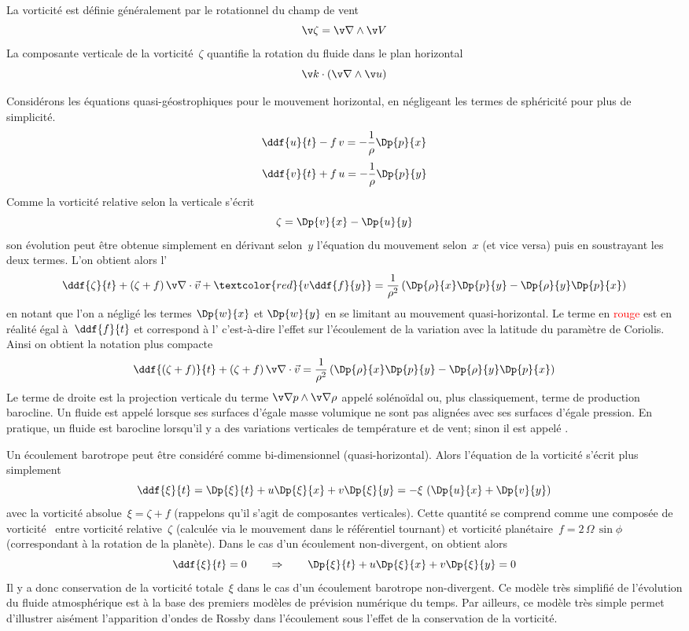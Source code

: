 \sk
La vorticité est définie généralement par le rotationnel du champ de vent
\[ \v \zeta = \v \nabla \wedge \v V \]
\noindent La composante verticale de la vorticité~$\zeta$
quantifie la rotation du fluide dans le plan horizontal
\[ \v k \cdot \left( \v \nabla \wedge \v u \right) \]

\sk
Considérons les équations quasi-géostrophiques pour le mouvement horizontal,
en négligeant les termes de sphéricité pour plus de simplicité.
\[ \ddf{u}{t} - f\,v = -\frac{1}{\rho} \Dp{p}{x} \]
\[ \ddf{v}{t} + f\,u = -\frac{1}{\rho} \Dp{p}{y} \]
\noindent Comme la vorticité relative selon la verticale s'écrit
\[ \zeta = \Dp{v}{x} - \Dp{u}{y} \]
\noindent son évolution peut être obtenue simplement en
dérivant selon~$y$ l'équation du mouvement selon~$x$
(et vice versa) puis en soustrayant les deux termes.
L'on obtient alors l'
\[
\ddf{\zeta}{t} + (\zeta+f) \, \v \nabla \cdot \vec v + \textcolor{red}{v \ddf{f}{y}}
= \frac{1}{\rho^2} \left( \Dp{\rho}{x} \Dp{p}{y} - \Dp{\rho}{y} \Dp{p}{x} \right)
\]
\noindent en notant que l'on a négligé les termes
$\Dp{w}{x}$ et $\Dp{w}{y}$ en se limitant au mouvement quasi-horizontal.
Le terme en \textcolor{red}{rouge} est en réalité égal à~$\ddf{f}{t}$
et correspond à l' c'est-à-dire
l'effet sur l'écoulement de la variation avec la
latitude du paramètre de Coriolis.
Ainsi on obtient la notation plus compacte
\[
\ddf{(\zeta + f)}{t} + (\zeta+f) \, \v \nabla \cdot \vec v
= \frac{1}{\rho^2} \left( \Dp{\rho}{x} \Dp{p}{y} - \Dp{\rho}{y} \Dp{p}{x} \right)
\]
\noindent Le terme de droite est la projection verticale
du terme $\v \nabla p \wedge \v \nabla \rho$
appelé solénoïdal ou, plus classiquement, terme de production barocline.
Un fluide est appelé  lorsque
ses surfaces d'égale masse volumique
ne sont pas alignées avec ses surfaces d'égale pression.
En pratique, un fluide est barocline
lorsqu'il y a des variations verticales de température
et de vent; sinon il est appelé .


\sk
Un écoulement barotrope peut être considéré comme bi-dimensionnel (quasi-horizontal).
Alors l'équation de la vorticité s'écrit plus simplement
\[
\ddf{\xi}{t}
=
\Dp{\xi}{t} + u \Dp{\xi}{x} + v \Dp{\xi}{y}
=
- \xi \, \left( \Dp{u}{x} + \Dp{v}{y} \right)
\]
\noindent avec la vorticité absolue~$\xi = \zeta + f$
(rappelons qu'il s'agit de composantes verticales). 
Cette quantité se comprend comme une \og composée de vorticité \fg~entre
vorticité relative~$\zeta$ (calculée via le mouvement dans le référentiel tournant)
et vorticité planétaire~$f = 2\,\Omega\,\sin\phi$ (correspondant à la rotation de la planète).
Dans le cas d'un écoulement non-divergent, on obtient alors
\[
\ddf{\xi}{t} = 0
\qquad
\Rightarrow
\qquad
\Dp{\xi}{t} + u \Dp{\xi}{x} + v \Dp{\xi}{y}
=
0
\]
\noindent Il y a donc conservation de la vorticité totale~$\xi$
dans le cas d'un écoulement barotrope non-divergent.
Ce modèle très simplifié de l'évolution du fluide atmosphérique
est à la base des premiers modèles de prévision numérique du temps.
Par ailleurs, ce modèle très simple permet d'illustrer aisément
l'apparition d'ondes de Rossby dans l'écoulement 
sous l'effet de la conservation de la vorticité.

